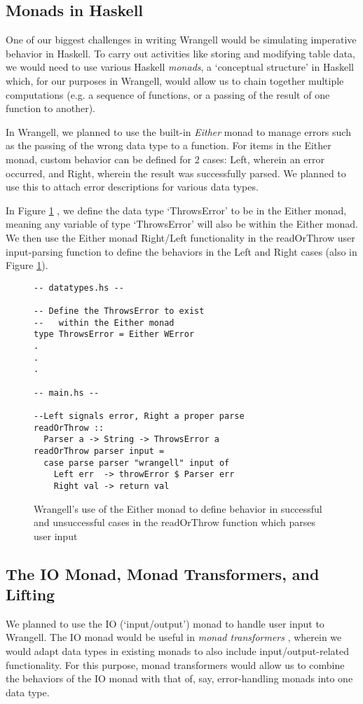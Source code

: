 \documentclass[preprint,nocopyrightspace]{sig-alternate}
\begin{document}
\subsection{Monads in Haskell}
One of our biggest challenges in writing Wrangell would be simulating imperative behavior in Haskell.  
To carry out activities like storing and modifying table data, we would need to use various Haskell \emph{monads}, a `conceptual structure' \cite{gentleMonads} in Haskell which, for our purposes in Wrangell, would allow us to chain together multiple computations (e.g. a sequence of functions, or a passing of the result of one function to another).

In Wrangell, we planned to use the built-in \emph{Either} monad to manage errors such as the passing of the wrong data type to a function. For items in the Either monad, custom behavior can be defined for 2 cases: Left, wherein an error occurred, and Right, wherein the result was successfully parsed. We planned to use this to attach error descriptions for various data types.  

In Figure \ref{eitherThrowError0} , we define the data type `ThrowsError' to be in the Either monad, meaning any variable of type `ThrowsError' will also be within the Either monad. We then use the Either monad Right/Left functionality in the readOrThrow user input-parsing function to define the behaviors in the Left and Right cases (also in Figure \ref{eitherThrowError0}).

\begin{figure}
\begin{lstlisting}
-- datatypes.hs --

-- Define the ThrowsError to exist 
--   within the Either monad
type ThrowsError = Either WError
.
.
.

-- main.hs --

--Left signals error, Right a proper parse
readOrThrow :: 
  Parser a -> String -> ThrowsError a
readOrThrow parser input = 
  case parse parser "wrangell" input of
    Left err  -> throwError $ Parser err
    Right val -> return val 

\end{lstlisting}
\caption{Wrangell's use of the Either monad to define behavior in successful and unsuccessful cases in the readOrThrow function which parses user input}
\label{eitherThrowError0}
\end{figure}

\subsection{The IO Monad, Monad Transformers, and Lifting}
We planned to use the IO (`input/output') monad to handle user input to Wrangell. The IO monad would be useful in \emph{monad transformers} \cite{monadTransform}, wherein we would adapt data types in existing monads to also include input/output-related functionality. For this purpose, monad transformers would allow us to combine the behaviors of the IO monad with that of, say, error-handling monads into one data type. 
\end{document}
